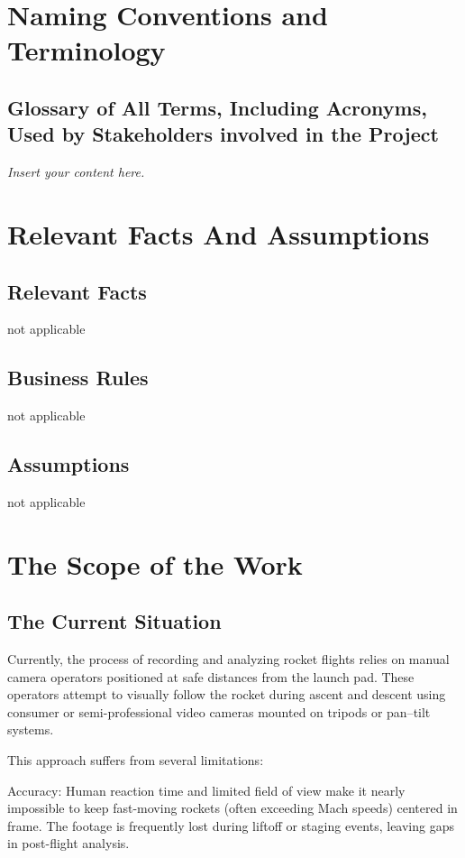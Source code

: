 \documentclass[12pt]{article}
\newcommand{\lips}{\textit{Insert your content here.}}
\begin{document}
\section{Naming Conventions and Terminology}
\subsection{Glossary of All Terms, Including Acronyms, Used by Stakeholders
  involved in the Project}
\lips

\section{Relevant Facts And Assumptions}
\subsection{Relevant Facts}

not applicable

\subsection{Business Rules}

not applicable

\subsection{Assumptions}

not applicable

\section{The Scope of the Work}
\subsection{The Current Situation}

Currently, the process of recording and analyzing rocket flights relies on
manual camera operators positioned at safe distances from the launch pad. These
operators attempt to visually follow the rocket during ascent and descent using
consumer or semi-professional video cameras mounted on tripods or pan–tilt
systems.

This approach suffers from several limitations:

Accuracy: Human reaction time and limited field of view make it nearly
impossible to keep fast-moving rockets (often exceeding Mach speeds) centered
in frame. The footage is frequently lost during liftoff or staging events,
leaving gaps in post-flight analysis.
\end{document}
